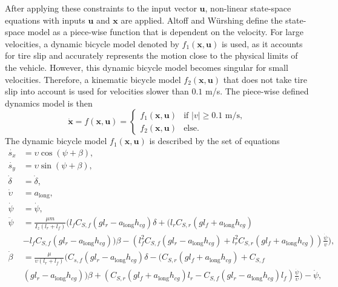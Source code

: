 After applying these constraints to the input vector $\mathbf{u}$, non-linear state-space equations with inputs $\mathbf{u}$ and $\mathbf{x}$ are applied.
Altoff and  W\"{u}rshing \cite{Althoff2020} define the state-space model as a piece-wise function that is dependent on the velocity. 
For large velocities, a dynamic bicycle model denoted by $f_1 (\mathbf{x}, \mathbf{u})$ is used, as it accounts for tire slip and accurately represents the motion close to the physical limits of the vehicle. 
However, this dynamic bicycle model becomes singular for small velocities. 
Therefore, a kinematic bicycle model $f_2 (\mathbf{x}, \mathbf{u})$ that does not take tire slip into account is used for velocities slower than $0.1$ m/s.
The piece-wise defined dynamics model is then
\begin{equation}
    \mathbf{\dot{x}} = f(\mathbf{x}, \mathbf{u}) = 
    \begin{cases}
    f_1 (\mathbf{x}, \mathbf{u}) & \text{if } |v| \geq 0.1 \text{ m/s}, \\
    f_2 (\mathbf{x}, \mathbf{u}) & \text{else.}
    \end{cases}
\label{eq:state_equation_cases}
\end{equation}
The dynamic bicycle model $f_1(\mathbf{x}, \mathbf{u})$ is described by the set of equations
\begin{equation}
\begin{split}
    \dot{s_x} &= \upsilon \cos(\psi + \beta), \\
    \dot{s_y} &= \upsilon \sin(\psi + \beta), \\
    \dot{\delta} &= \dot{\delta}, \\
    \dot{\upsilon} &= a_{\text{long}}, \\
    \dot{\psi} &= \dot{\psi}, \\
    \ddot{\psi} &= \frac{\mu m}{I_{z} (l_{r} + l_{f})}
    ( l_f C_{S,f} (g l_r - a_{\text{long}} h_{cg}) \delta + 
    (l_{r} C_{S,r} (g l_{f} + a_{\text{long}} h_{cg}) \\ &- 
    l_{f} C_{S,f} (g l_{r} - a_{\text{long}} h_{cg})) \beta -
    (l_{f}^{2} C_{S,f} (g l_{r} - a_{\text{long}} h_{cg}) +
    l_{r}^{2} C_{S,r} (g l_{f} + a_{\text{long}} h_{cg})) 
    \frac{\dot{\psi}}{v}), \\
    \dot{\beta} &= \frac{\mu}{\upsilon(l_r+l_f)} 
    ( C_{s,f}(g l_{r} - a_{\text{long}} h_{cg}) \delta - 
    (C_{S,r}(g l_f + a_{\text{long}} h_{cg}) + 
    C_{S,f} \\& (g l_r - a_{\text{long}} h_{cg})) \beta + 
    (C_{S,r} (g l_{f} + a_{\text{long}} h_{cg})l_{r} - 
    C_{S,f} (g l_{r} - a_{\text{long}} h_{cg}) l_{f}) 
    \frac{\dot{\psi}}{\upsilon} ) - \dot{\psi},
\label{eq:single_track_dynamic_equations}
\end{split}
\end{equation}
